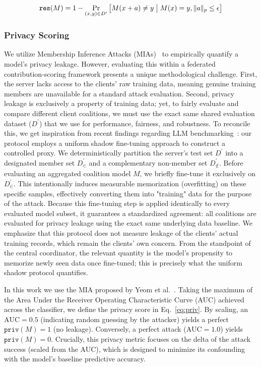 \documentclass[acmsmall]{acmart}
\begin{document}
\begin{equation}
    \label{eq:res}
    \mathtt{res}(M) = 1 - \Pr_{(x,y) \in D^\prime}\big[ M(x+a) \neq y \bigm| M(x)=y, \|a\|_p \leq \epsilon \big]
\end{equation}

\subsubsection*{Privacy Scoring}

We utilize Membership Inference Attacks (MIAs)~\cite{bai2024membership} to empirically quantify a model's privacy leakage. However, evaluating this within a federated contribution-scoring framework presents a unique methodological challenge. First, the server lacks access to the clients' raw training data, meaning genuine training members are unavailable for a standard attack evaluation. Second, privacy leakage is exclusively a property of training data; yet, to fairly evaluate and compare different client coalitions, we must use the exact same shared evaluation dataset ($D^\prime$) that we use for performance, fairness, and robustness. To reconcile this, we get inspiration from recent findings regarding LLM benchmarking~\cite{hardt2025emerging}: our protocol employs a uniform shadow fine-tuning approach to construct a controlled proxy. We deterministically partition the server's test set $D^\prime$ into a designated member set $D^\prime_\in$ and a complementary non-member set $D^\prime_{\not\in}$. Before evaluating an aggregated coalition model $M$, we briefly fine-tune it exclusively on $D^\prime_\in$. This intentionally induces measurable memorization (overfitting) on these specific samples, effectively converting them into "training" data for the purpose of the attack. Because this fine-tuning step is applied identically to every evaluated model subset, it guarantees a standardized agreement: all coalitions are evaluated for privacy leakage using the exact same underlying data baseline. We emphasize that this protocol does not measure leakage of the clients' actual training records, which remain the clients' own concern. From the standpoint of the central coordinator, the relevant quantity is the model's propensity to memorize newly seen data once fine-tuned; this is precisely what the uniform shadow protocol quantifies.

In this work we use the MIA proposed by Yeom et al.~\cite{yeom2018privacy}. Taking the maximum of the Area Under the Receiver Operating Characteristic Curve (AUC) achieved across the classifier, we define the privacy score in Eq.~\eqref{eq:priv}. By scaling, an $\text{AUC} = 0.5$ (indicating random guessing by the attacker) yields a perfect $\mathtt{priv}(M) = 1$ (no leakage). Conversely, a perfect attack ($\text{AUC} = 1.0$) yields $\mathtt{priv}(M) = 0$. Crucially, this privacy metric focuses on the delta of the attack success (scaled from the AUC), which is designed to minimize its confounding with the model's baseline predictive accuracy.
\end{document}
